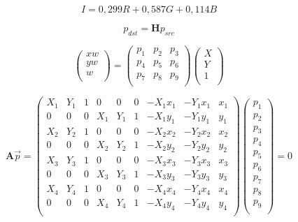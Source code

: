 \begin{equation}
  I = 0,299R + 0,587G + 0,114B
\end{equation}

\begin{equation}
  p_{dst} = \mathbf{H} p_{src}
\end{equation}

\begin{equation}
  \left(
    \begin{array}{c}
      x w \\
      y w \\
      w \\
    \end{array}
  \right)
  =
  \left(
    \begin{array}{ccc}
      p_{1} & p_{2}  & p_{3} \\
      p_{4} & p_{5}  & p_{6} \\
      p_{7} & p_{8}  & p_{9} \\
    \end{array}
  \right)
  \left(
    \begin{array}{c}
      X \\
      Y \\
      1 \\
    \end{array}
  \right)
\end{equation}

\begin{equation}
  \mathbf{A} \vec{p} =
  \left(
    \begin{array}{ccccccccc}
      X_{1} & Y_{1} & 1 & 0 & 0 & 0 & -X_{1} x_{1} & -Y_{1} x_{1} & x_{1} \\
      0 & 0 & 0 & X_{1} & Y_{1} & 1 & -X_{1} y_{1} & -Y_{1} y_{1} & y_{1} \\
      X_{2} & Y_{2} & 1 & 0 & 0 & 0 & -X_{2} x_{2} & -Y_{2} x_{2} & x_{2} \\
      0 & 0 & 0 & X_{2} & Y_{2} & 1 & -X_{2} y_{2} & -Y_{2} y_{2} & y_{2} \\
      X_{3} & Y_{3} & 1 & 0 & 0 & 0 & -X_{3} x_{3} & -Y_{3} x_{3} & x_{3} \\
      0 & 0 & 0 & X_{3} & Y_{3} & 1 & -X_{3} y_{3} & -Y_{3} y_{3} & y_{3} \\
      X_{4} & Y_{4} & 1 & 0 & 0 & 0 & -X_{4} x_{4} & -Y_{4} x_{4} & x_{4} \\
      0 & 0 & 0 & X_{4} & Y_{4} & 1 & -X_{4} y_{4} & -Y_{4} y_{4} & y_{4} \\
    \end{array}
  \right)
  \left(
    \begin{array}{c}
      p_{1} \\
      p_{2} \\
      p_{3} \\
      p_{4} \\
      p_{5} \\
      p_{6} \\
      p_{7} \\
      p_{8} \\
      p_{9} \\
    \end{array}
  \right)
  = 0
\end{equation}


